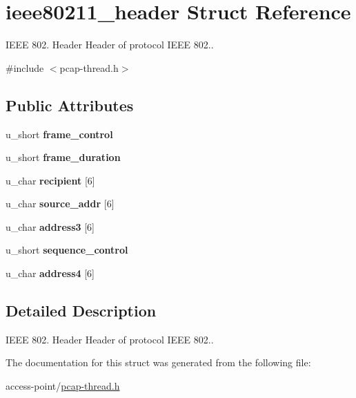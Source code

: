 \hypertarget{structieee80211__header}{\section{ieee80211\-\_\-header Struct Reference}
\label{structieee80211__header}
}


I\-E\-E\-E 802. Header Header of protocol I\-E\-E\-E 802..  




{\ttfamily \#include $<$pcap-\/thread.\-h$>$}

\subsection*{Public Attributes}
\begin{DoxyCompactItemize}
\item 
\hypertarget{structieee80211__header_aaa9c4e9502842e191a237ee80f89c292}{u\-\_\-short {\bfseries frame\-\_\-control}}\label{structieee80211__header_aaa9c4e9502842e191a237ee80f89c292}

\item 
\hypertarget{structieee80211__header_aff9ef1a16cd65df85e6abd03835cc2df}{u\-\_\-short {\bfseries frame\-\_\-duration}}\label{structieee80211__header_aff9ef1a16cd65df85e6abd03835cc2df}

\item 
\hypertarget{structieee80211__header_ad269c3c4354cbde2864c44fc9584d929}{u\-\_\-char {\bfseries recipient} \mbox{[}6\mbox{]}}\label{structieee80211__header_ad269c3c4354cbde2864c44fc9584d929}

\item 
\hypertarget{structieee80211__header_afbd721b7ef6d4202ebc83f0e6a68742e}{u\-\_\-char {\bfseries source\-\_\-addr} \mbox{[}6\mbox{]}}\label{structieee80211__header_afbd721b7ef6d4202ebc83f0e6a68742e}

\item 
\hypertarget{structieee80211__header_a0f804665fc1f60a1cdc868804dd54e94}{u\-\_\-char {\bfseries address3} \mbox{[}6\mbox{]}}\label{structieee80211__header_a0f804665fc1f60a1cdc868804dd54e94}

\item 
\hypertarget{structieee80211__header_a43c2294d4f1591916910da93f8813ec6}{u\-\_\-short {\bfseries sequence\-\_\-control}}\label{structieee80211__header_a43c2294d4f1591916910da93f8813ec6}

\item 
\hypertarget{structieee80211__header_a54150ad91cd2d9f21e3a8719fffdbc56}{u\-\_\-char {\bfseries address4} \mbox{[}6\mbox{]}}\label{structieee80211__header_a54150ad91cd2d9f21e3a8719fffdbc56}

\end{DoxyCompactItemize}


\subsection{Detailed Description}
I\-E\-E\-E 802. Header Header of protocol I\-E\-E\-E 802.. 

The documentation for this struct was generated from the following file\-:\begin{DoxyCompactItemize}
\item 
access-\/point/\hyperlink{pcap-thread_8h}{pcap-\/thread.\-h}\end{DoxyCompactItemize}
